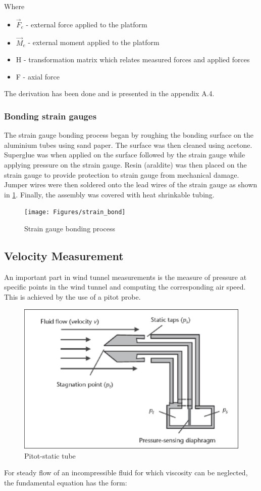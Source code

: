Where
\begin{itemize}
	\item $\vec{F}_e $ - external force applied to the platform
	\item $\vec{M}_e$ - external moment applied to the platform
	\item H - transformation matrix which relates measured forces and applied forces
	\item F - axial force
\end{itemize}
The derivation has been done and is presented in the appendix A.4.

\subsubsection*{Bonding strain gauges}
The strain gauge bonding process began by roughing the bonding surface on the aluminium tubes using sand paper. 
The surface was then cleaned using acetone. Superglue was when applied on the surface followed by the strain gauge while applying pressure on the strain gauge. 
Resin (araldite) was then placed on the strain gauge to provide protection to strain gauge from mechanical damage. 
Jumper wires were then soldered onto the lead wires of the strain gauge as shown in \ref{fig:strain_bond}. 
Finally, the assembly was covered with heat shrinkable tubing.
\begin{center}
	\begin{figure}[H]
		\centering
		\texttt{[image: Figures/strain\_bond]}
		\caption[Strain gauge bonding process]{Strain gauge bonding process}
		\label{fig:strain_bond}
	\end{figure}
\end{center}

\subsection{Velocity Measurement}
An important part in wind tunnel measurements is the measure of pressure at specific points in the wind tunnel and computing the corresponding air speed. This is achieved by the use of a pitot probe.
\begin{center}
	\begin{figure}[H]
		\centering
		\includegraphics[width=0.6\linewidth]{Figures/pitot}
		\caption[Pitot-static tube]{Pitot-static tube \cite{viquerat_continuous_2006}}
	\end{figure}
\end{center}
For steady flow of an incompressible fluid for which viscosity can be neglected, the fundamental equation has the form\cite{viquerat_continuous_2006}:

